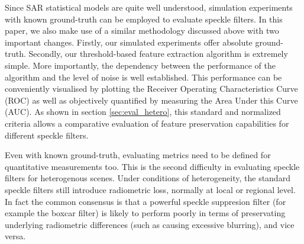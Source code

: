 \documentclass[journal]{IEEEtran}
\begin{document}
Since SAR statistical models are quite well understood, 
	simulation experiments with known ground-truth can be employed 
		to evaluate speckle filters.
In this paper, we also make use of a similar methodology discussed above with two important changes.
Firstly, our simulated experiments offer absolute ground-truth.
Secondly, our threshold-based feature extraction algorithm is extremely simple.
More importantly, the dependency between the performance of the algorithm and the level of noise is well established. 
This performance can be 
	conveniently visualised by plotting the Receiver Operating Characteristics Curve (ROC) 
	as well as objectively quantified by measuring the Area Under this Curve (AUC). 
As shown in section \ref{sec:eval_hetero}, this standard and normalized criteria allows a comparative evaluation of feature preservation capabilities for different speckle filters.

%

Even with known ground-truth, evaluating metrics need to be defined for quantitative measurements too.
This is the second difficulty in evaluating speckle filters for heterogenous scenes.
Under conditions of heterogeneity, the standard speckle filters still introduce radiometric loss, normally at local or regional level.
In fact the common consensus is that a powerful speckle suppresion filter (for example the boxcar filter) is likely to perform poorly in terms of preservating underlying radiometric differences (such as causing excessive blurring), and vice versa. 
\end{document}
